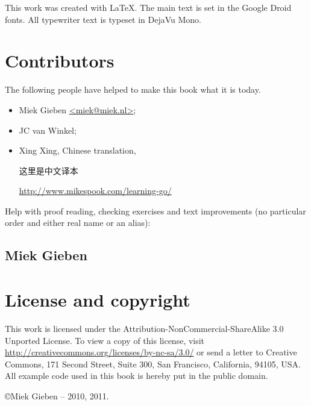 \noindent{}This work was created with \LaTeX. The main text is set in
the Google Droid fonts. All typewriter text is typeset in DejaVu Mono.

\section{Contributors}
The following people have helped to make this book what it is today.
\begin{itemize}
\item{Miek Gieben \qquad\url{<miek@miek.nl>}};
\item{JC van Winkel};
\item{Xing Xing, Chinese translation,
\begin{cjk}
这里是中文译本 
\end{cjk}

\url{http://www.mikespook.com/learning-go/}
}
\end{itemize}

Help with proof reading, checking exercises and text improvements (no
particular order and either real name or an alias):


\subsection{Miek Gieben}


\section{License and copyright}
This work is licensed under the Attribution-NonCommercial-ShareAlike 3.0 Unported License. To
view a copy of this license, visit \url{http://creativecommons.org/licenses/by-nc-sa/3.0/}
or send a letter to Creative Commons, 171 Second Street, Suite 300, San
Francisco, California, 94105, USA.\newline
All example code used in this book is hereby put in the public domain.

\copyright Miek Gieben -- 2010, 2011.
